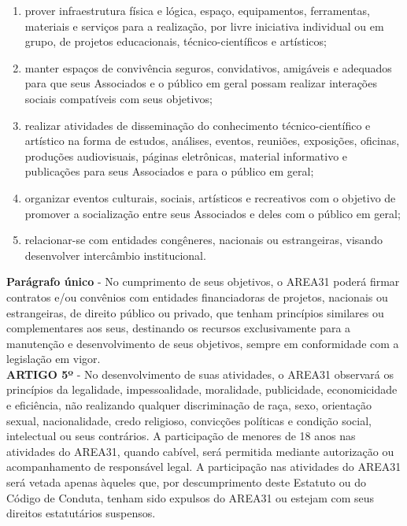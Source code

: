 \begin{enumerate}[label=\Roman* -]
    \item prover infraestrutura física e lógica, espaço, equipamentos, 
        ferramentas, materiais e serviços para a realização, 
        por livre iniciativa individual ou em grupo, de projetos educacionais,
        técnico-científicos e artísticos;
    \item manter espaços de convivência seguros, convidativos, amigáveis 
        e adequados para que seus Associados e o público em geral possam 
        realizar interações sociais compatíveis com seus objetivos;
    \item realizar atividades de disseminação do conhecimento 
        técnico-científico e artístico na forma de estudos, análises, 
        eventos, reuniões, exposições, oficinas, produções audiovisuais, 
        páginas eletrônicas, material informativo e publicações para seus 
        Associados e para o público em geral;
    \item organizar eventos culturais, sociais, artísticos e recreativos 
        com o objetivo de promover a socialização entre seus Associados 
        e deles com o público em geral; 
    \item relacionar-se com entidades congêneres, nacionais ou 
        estrangeiras, visando desenvolver intercâmbio institucional.
\end{enumerate}


\textbf{Parágrafo único} - No cumprimento de seus objetivos, o AREA31 poderá 
firmar contratos e/ou convênios com entidades financiadoras de projetos, 
nacionais ou estrangeiras, de direito público ou privado, que tenham 
princípios similares ou complementares aos seus, destinando os recursos 
exclusivamente para a manutenção e desenvolvimento de seus objetivos, 
sempre em conformidade com a legislação em vigor.
\\

\textbf{ARTIGO 5º} - No desenvolvimento de suas atividades, o AREA31 
observará os princípios da legalidade, impessoalidade, moralidade, 
publicidade, economicidade e eficiência, não realizando qualquer 
discriminação de raça, sexo, orientação sexual, nacionalidade, 
credo religioso, convicções políticas e condição social, intelectual ou 
seus contrários.
A participação de menores de 18 anos nas atividades do AREA31, quando cabível,
será permitida mediante autorização ou acompanhamento de responsável legal.
A participação nas atividades do AREA31 será vetada apenas àqueles que, 
por descumprimento deste Estatuto ou do Código de Conduta, tenham sido 
expulsos do AREA31 ou estejam com seus direitos estatutários suspensos.
